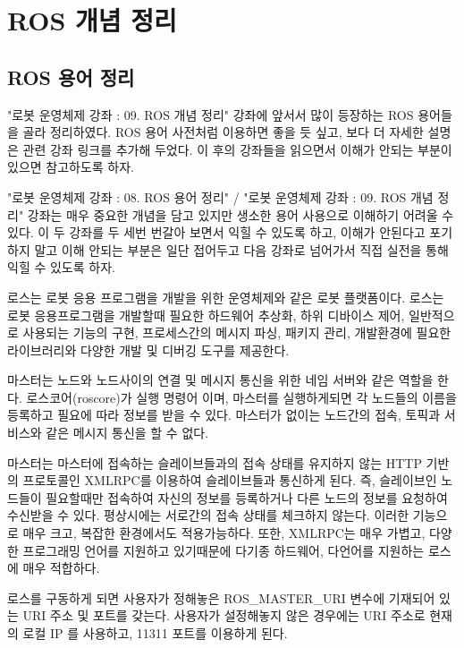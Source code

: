 
\chapter{ROS 개념 정리}

\section{ROS 용어 정리}

"로봇 운영체제 강좌 : 09. ROS 개념 정리" 강좌에 앞서서 많이 등장하는 ROS 용어들을 골라 정리하였다. ROS 용어 사전처럼 이용하면 좋을 듯 싶고, 보다 더 자세한 설명은 관련 강좌 링크를 추가해 두었다. 이 후의 강좌들을 읽으면서 이해가 안되는 부분이 있으면 참고하도록 하자. 

"로봇 운영체제 강좌 : 08. ROS 용어 정리" / "로봇 운영체제 강좌 : 09. ROS 개념 정리" 강좌는 매우 중요한 개념을 담고 있지만 생소한 용어 사용으로 이해하기 어려울 수 있다. 이 두 강좌를 두 세번 번갈아 보면서 익힐 수 있도록 하고, 이해가 안된다고 포기하지 말고 이해 안되는 부분은 일단 접어두고 다음 강좌로 넘어가서 직접 실전을 통해 익힐 수 있도록 하자.

\begin{definition}[ROS]
로스는 로봇 응용 프로그램을 개발을 위한 운영체제와 같은 로봇 플랫폼이다. 로스는 로봇 응용프로그램을 개발할때 필요한 하드웨어 추상화, 하위 디바이스 제어, 일반적으로 사용되는 기능의 구현, 프로세스간의 메시지 파싱, 패키지 관리, 개발환경에 필요한 라이브러리와 다양한 개발 및 디버깅 도구를 제공한다.
\end{definition}

\begin{definition}
마스터는 노드와 노드사이의 연결 및 메시지 통신을 위한 네임 서버와 같은 역할을 한다. 로스코어(roscore)가 실행 명령어 이며, 마스터를 실행하게되면 각 노드들의 이름을 등록하고 필요에 따라 정보를 받을 수 있다. 마스터가 없이는 노드간의 접속, 토픽과 서비스와 같은 메시지 통신을 할 수 없다. 

마스터는 마스터에 접속하는 슬레이브들과의 접속 상태를 유지하지 않는 HTTP 기반의 프로토콜인 XMLRPC를 이용하여 슬레이브들과 통신하게 된다. 즉, 슬레이브인 노드들이 필요할때만 접속하여 자신의 정보를 등록하거나 다른 노드의 정보를 요청하여 수신받을 수 있다. 평상시에는 서로간의 접속 상태를 체크하지 않는다. 이러한 기능으로 매우 크고, 복잡한 환경에서도 적용가능하다. 또한, XMLRPC는 매우 가볍고, 다양한 프로그래밍 언어를 지원하고 있기때문에 다기종 하드웨어, 다언어를 지원하는 로스에 매우 적합하다.

로스를 구동하게 되면 사용자가 정해놓은 ROS\_MASTER\_URI 변수에 기재되어 있는 URI 주소 및 포트를 갖는다. 사용자가 설정해놓지 않은 경우에는 URI 주소로 현재의 로컬 IP 를 사용하고, 11311 포트를 이용하게 된다.
\end{definition}

